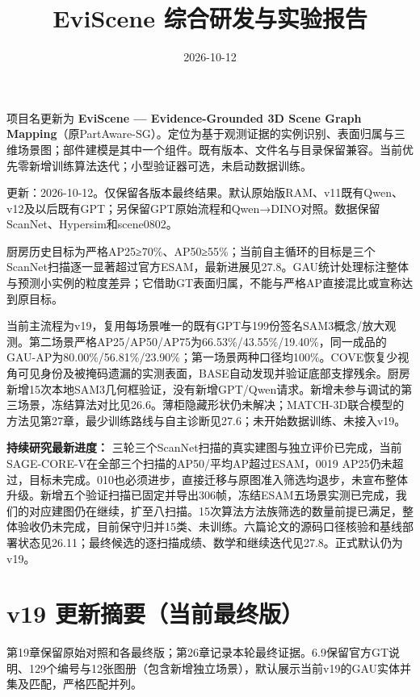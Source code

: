 \documentclass[UTF8,fontset=fandol]{ctexart}
\title{EviScene 综合研发与实验报告}
\author{}
\date{2026-10-12}
\begin{document}
\maketitle
\tableofcontents
\clearpage

项目名更新为 \textbf{EviScene — Evidence-Grounded 3D Scene Graph Mapping}（原PartAware-SG）。定位为基于观测证据的实例识别、表面归属与三维场景图；部件建模是其中一个组件。既有版本、文件名与目录保留兼容。当前优先零新增训练算法迭代；小型验证器可选，未启动数据训练。



更新：2026-10-12。仅保留各版本最终结果。默认原始版RAM、v11既有Qwen、v12及以后既有GPT；另保留GPT原始流程和Qwen→DINO对照。数据保留ScanNet、Hypersim和scene0802。



厨房历史目标为严格AP25≥70\%、AP50≥55\%；当前自主循环的目标是三个ScanNet扫描逐一显著超过官方ESAM，最新进展见27.8。GAU统计处理标注整体与预测小实例的粒度差异；它借助GT表面归属，不能与严格AP直接混比或宣称达到原目标。



当前主流程为v19，复用每场景唯一的既有GPT与199份签名SAM3概念/放大观测。第二场景严格AP25/AP50/AP75为66.53\%/43.55\%/19.40\%，同一成品的GAU-AP为80.00\%/56.81\%/23.90\%；第一场景两种口径均100\%。COVE恢复少视角可见身份及被掩码遗漏的实测表面，BASE自动发现并验证底部支撑残余。厨房新增15次本地SAM3几何框验证，没有新增GPT/Qwen请求。新增未参与调试的第三场景，冻结算法对比见26.6。薄柜隐藏形状仍未解决；MATCH-3D联合模型的方法见第27章，最少训练路线与自主诊断见27.6；未开始数据训练、未接入v19。



\textbf{持续研究最新进度：} 三轮三个ScanNet扫描的真实建图与独立评价已完成，当前SAGE-CORE-V在全部三个扫描的AP50/平均AP超过ESAM，0019 AP25仍未超过，目标未完成。010也必须进步，直接迁移与原图准入筛选均退步，未宣布整体升级。新增五个验证扫描已固定并导出306帧，冻结ESAM五场景实测已完成，我们的对应建图仍在继续，扩至八扫描。15次算法方法族筛选的数量前提已满足，整体验收仍未完成，目前保守归并15类、未训练。六篇论文的源码口径核验和基线部署状态见26.11；最终候选的逐扫描成绩、数学和继续迭代见27.8。正式默认仍为v19。



\section*{v19 更新摘要（当前最终版）}

第19章保留原始对照和各最终版；第26章记录本轮最终证据。6.9保留官方GT说明、129个编号与12张图册（包含新增独立场景），默认展示当前v19的GAU实体并集及匹配，严格匹配并列。
\end{document}
